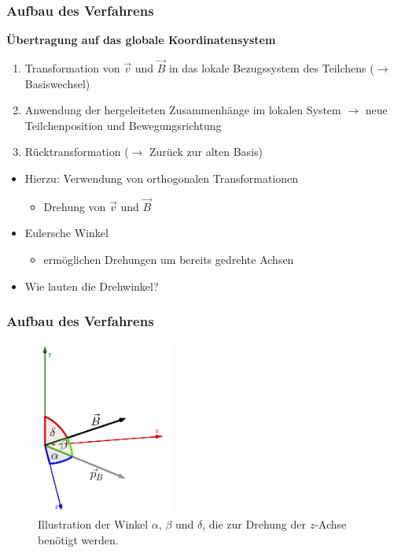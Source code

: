 \begin{frame}
  \frametitle{Aufbau des Verfahrens}
  \textbf{\"Ubertragung auf das globale Koordinatensystem}
  \begin{enumerate}
    \item Transformation von \(\vec{v}\) und \(\vec{B}\) in das lokale Bezugssystem des Teilchens (\(\rightarrow\) Basiswechsel)
    \item Anwendung der hergeleiteten Zusammenh\"ange im lokalen System \(\rightarrow\) neue Teilchenposition und Bewegungsrichtung
    \item R\"ucktransformation (\(\rightarrow\) Zur\"uck zur alten Basis)
  \end{enumerate}
  \begin{itemize}
    \item Hierzu: Verwendung von orthogonalen Transformationen
      \begin{itemize}
        \item Drehung von \(\vec{v}\) und \(\vec{B}\)
      \end{itemize}
    \item Eulersche Winkel
      \begin{itemize}
        \item erm\"oglichen Drehungen um bereits gedrehte Achsen
      \end{itemize}
    \item Wie lauten die Drehwinkel?
  \end{itemize}
\end{frame}

\begin{frame}
  \frametitle{Aufbau des Verfahrens}
  \begin{figure}
    \centering
    \includegraphics[width=0.4\textwidth]{../geogebra/img/winkel_edited}
    \caption{Illustration der Winkel \(\alpha\), \(\beta\) und \(\delta\), die zur Drehung der \(z\)-Achse ben\"otigt werden.}
    \label{fig:winkelfig}
  \end{figure}
\end{frame}

